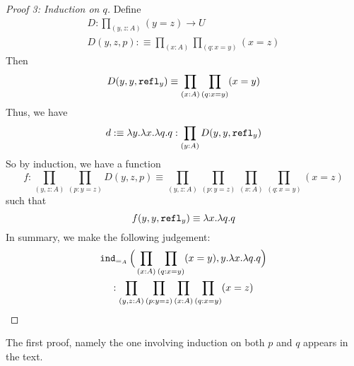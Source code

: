 \documentclass[a5paper]{article}
\begin{document}
\begin{proof}[Proof 3: Induction on $q$]
	Define 
  \begin{gather*}
    D:\prod_{(y,z:A)}(y=z)\to U \\
    D(y,z,p):\equiv\prod_{(x:A)}\prod_{(q:x=y)} (x=z)
  \end{gather*}
  Then
  \begin{equation*}
    D(y,y,\operatorname{\mathtt{refl}}_y)\equiv \prod_{(x:A)}\prod_{(q:x=y)}(x=y)
  \end{equation*}
  Thus, we have
  \begin{equation*}
    d:\equiv\lambda y.\lambda x.\lambda q.q : \prod_{(y:A)} D(y,y,\operatorname{\mathtt{refl}}_y)
  \end{equation*}
  So by induction, we have a function
  \begin{equation*}
    f:\prod_{(y,z:A)}\prod_{(p:y=z)} D(y,z,p)
    \equiv\prod_{(y,z:A)}\prod_{(p:y=z)}\prod_{(x:A)}\prod_{(q:x=y)} (x=z)
  \end{equation*}
  such that 
  \begin{equation*}
    f(y,y,\operatorname{\mathtt{refl}}_y)\equiv \lambda x.\lambda q.q
  \end{equation*}
  In summary, we make the following judgement:
  \begin{multline*}
    \operatorname{\mathtt{ind}}_{=_A}\Big(\prod_{(x:A)}\prod_{(q:x=y)}(x=y),
    y.\lambda x.\lambda q.q\Big) \\
    :\prod_{(y,z:A)}\prod_{(p:y=z)}\prod_{(x:A)}\prod_{(q:x=y)} (x=z)
  \end{multline*}
\end{proof}

The first proof, namely the one involving induction on both $p$ and $q$ appears
in the text.
\end{document}
